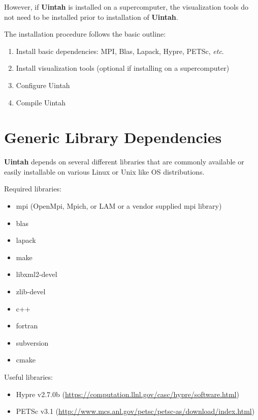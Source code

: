 \documentclass[12pt]{article}
\begin{document}
However, if \textbf{Uintah} is installed on a supercomputer, the
visualization tools do not need to be installed prior to installation
of \textbf{Uintah}.

The installation procedure follows the basic outline:

\begin{enumerate}

\item Install basic dependencies: MPI, Blas, Lapack, Hypre, PETSc, \emph{etc}.

\item Install visualization tools (optional if installing on a supercomputer)

\item Configure Uintah

\item Compile Uintah


\end{enumerate}


\section{Generic Library Dependencies}

\textbf{Uintah} depends on several different libraries that are commonly
available or easily installable on various Linux or Unix like OS
distributions.  

Required libraries:
\begin{itemize}
\item mpi (OpenMpi, Mpich, or LAM or a vendor supplied mpi library)
\item blas
\item lapack
\item make
\item libxml2-devel
\item zlib-devel
\item c++
\item fortran
\item subversion
\item cmake

\end{itemize}

Useful libraries:
\begin{itemize}
\item Hypre v2.7.0b (\url{https://computation.llnl.gov/casc/hypre/software.html})
\item PETSc v3.1 (\url{http://www.mcs.anl.gov/petsc/petsc-as/download/index.html})
\end{itemize}
\end{document}
